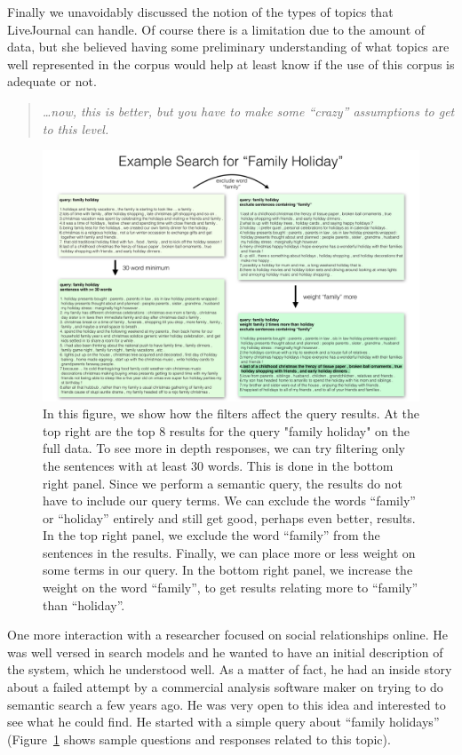 \documentclass{sigchi}
\begin{document}
Finally we unavoidably discussed the notion of the types of topics that LiveJournal can handle. Of course there is a limitation due to the amount of data, but she believed having some preliminary understanding of what topics are well represented in the corpus would help at least know if the use of this corpus is adequate or not.

\begin{quote}
{\em
\dots now, this is better, but you have to make some ``crazy'' assumptions to get to this level.
}\end{quote}


\begin{figure}[ht!]
\centering \includegraphics[width=.85\textwidth]{figures/results_1} 
\caption{In this figure, we show how the filters affect the query results. 
At the top right are the top 8 results for the query "family holiday" on the full data.  
To see more in depth responses, we can try filtering only the sentences with at least 30 words. 
This is done in the bottom right panel. 
Since we perform a semantic query, the results do not have to include our query terms. 
We can exclude the words ``family'' or ``holiday''  entirely and still get good, perhaps even better, results.
In the top right panel, we exclude the word ``family'' from the sentences in the results.
Finally, we can place more or less weight on some terms in our query. 
In the bottom right panel, we increase the weight on the word ``family'', 
to get results relating more to ``family'' than ``holiday''.
\label{fig:familyHolidays}
}
\end{figure}

One more interaction with a researcher focused on social relationships online. He was well versed in search models and he wanted to have an initial description of the system, which he understood well. As a matter of fact, he had an inside story about a failed attempt by a commercial analysis software maker on trying to do semantic search a few years ago. He was very open to this idea and interested to see what he could find. He started with a simple query about ``family holidays'' (Figure~\ref{fig:familyHolidays} shows sample questions and responses related to this topic).
\end{document}
